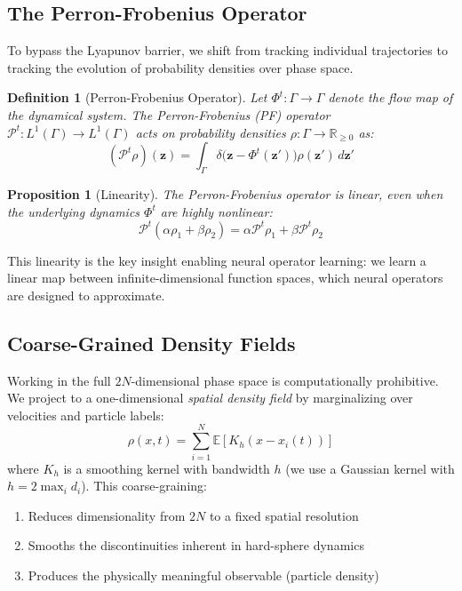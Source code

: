 \documentclass[11pt]{article}
\newcommand{\R}{\mathbb{R}}
\newcommand{\E}{\mathbb{E}}
\newcommand{\PF}{\mathcal{P}}
\newtheorem{definition}{Definition}
\newtheorem{proposition}{Proposition}
\begin{document}
\subsection{The Perron-Frobenius Operator}

To bypass the Lyapunov barrier, we shift from tracking individual trajectories to tracking the evolution of probability densities over phase space.

\begin{definition}[Perron-Frobenius Operator]
Let $\Phi^t: \Gamma \to \Gamma$ denote the flow map of the dynamical system. The Perron-Frobenius (PF) operator $\PF^t: L^1(\Gamma) \to L^1(\Gamma)$ acts on probability densities $\rho: \Gamma \to \R_{\geq 0}$ as:
\begin{equation}
    (\PF^t \rho)(\bm{z}) = \int_{\Gamma} \delta\bigl(\bm{z} - \Phi^t(\bm{z}')\bigr) \rho(\bm{z}') \, d\bm{z}'
\end{equation}
\end{definition}

\begin{proposition}[Linearity]
The Perron-Frobenius operator is linear, even when the underlying dynamics $\Phi^t$ are highly nonlinear:
\begin{equation}
    \PF^t(\alpha \rho_1 + \beta \rho_2) = \alpha \PF^t \rho_1 + \beta \PF^t \rho_2
\end{equation}
\end{proposition}

This linearity is the key insight enabling neural operator learning: we learn a linear map between infinite-dimensional function spaces, which neural operators are designed to approximate.

\subsection{Coarse-Grained Density Fields}

Working in the full $2N$-dimensional phase space is computationally prohibitive. We project to a one-dimensional \textit{spatial density field} by marginalizing over velocities and particle labels:
\begin{equation}
    \rho(x, t) = \sum_{i=1}^{N} \E\left[ K_h(x - x_i(t)) \right]
\end{equation}
where $K_h$ is a smoothing kernel with bandwidth $h$ (we use a Gaussian kernel with $h = 2 \max_i d_i$). This coarse-graining:
\begin{enumerate}
    \item Reduces dimensionality from $2N$ to a fixed spatial resolution
    \item Smooths the discontinuities inherent in hard-sphere dynamics
    \item Produces the physically meaningful observable (particle density)
\end{enumerate}
\end{document}
